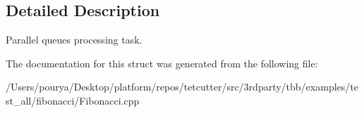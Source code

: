 \subsection{Detailed Description}
Parallel queue\textquotesingle{}s processing task. 

The documentation for this struct was generated from the following file\+:\begin{DoxyCompactItemize}
\item 
/\+Users/pourya/\+Desktop/platform/repos/tetcutter/src/3rdparty/tbb/examples/test\+\_\+all/fibonacci/Fibonacci.\+cpp\end{DoxyCompactItemize}
